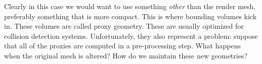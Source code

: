       Clearly in this case we would want to use something \emph{other} than
      the render mesh, preferably something that is more compact. This is
      where bounding volumes kick in. These volumes are called proxy geometry.
      These are usually optimized for collision detection systems.
      Unfortunately, they also represent a problem: suppose that all of the
      proxies are computed in a pre-processing step. What happens when the
      original mesh is altered? How do we maintain these new geometries?
